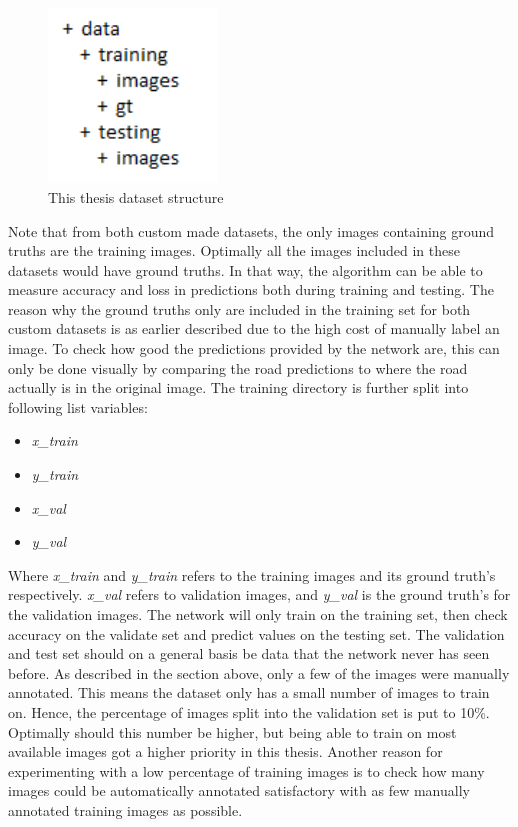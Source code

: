 \documentclass[USenglish]{ifimaster}  %
\begin{document}
\begin{figure}[H]
    \centering
    \includegraphics[width=0.4\textwidth]{bilder/dataset_structure.PNG}
    \caption{This thesis dataset structure}
    \label{fig:dataset_structure}
\end{figure}

Note that from both custom made datasets, the only images containing ground truths are the training images. Optimally all the images included in these datasets would have ground truths. In that way, the algorithm can be able to measure accuracy and loss in predictions both during training and testing. The reason why the ground truths only are included in the training set for both custom datasets is as earlier described due to the high cost of manually label an image. To check how good the predictions provided by the network are, this can only be done visually by comparing the road predictions to where the road actually is in the original image.
\newline
\newline
The training directory is further split into following list variables:
\begin{itemize}
    \item \textit{x\_train}
    \item \textit{y\_train}
    \item \textit{x\_val}
    \item \textit{y\_val}
\end{itemize}
Where \textit{x\_train} and \textit{y\_train} refers to the training images and its ground truth's respectively. \textit{x\_val} refers to validation images, and \textit{y\_val} is the ground truth's for the validation images. The network will only train on the training set, then check accuracy on the validate set and predict values on the testing set. The validation and test set should on a general basis be data that the network never has seen before. As described in the section above, only a few of the images were manually annotated. This means the dataset only has a small number of images to train on. Hence, the percentage of images split into the validation set is put to 10\%. Optimally should this number be higher, but being able to train on most available images got a higher priority in this thesis. Another reason for experimenting with a low percentage of training images is to check how many images could be automatically annotated satisfactory with as few manually annotated training images as possible.
\end{document}
